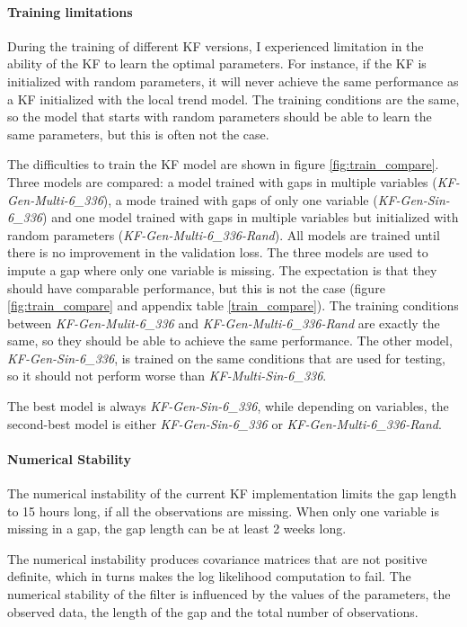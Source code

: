 \documentclass{article}
\begin{document}
\paragraph{Training limitations} During the training of different KF versions, I experienced limitation in the ability of the KF to learn the optimal parameters. For instance, if the KF is initialized with random parameters, it will never achieve the same performance as a KF initialized with the local trend model. The training conditions are the same, so the model that starts with random parameters should be able to learn the same parameters, but this is often not the case.

The difficulties to train the KF model are shown in figure \ref{fig:train_compare}.
Three models are compared: a model trained with gaps in multiple variables (\textit{KF-Gen-Multi-6\_336}), a mode trained with gaps of only one variable (\textit{KF-Gen-Sin-6\_336}) and one model trained with gaps in multiple variables but initialized with random parameters (\textit{KF-Gen-Multi-6\_336-Rand}).
All models are trained until there is no improvement in the validation loss. The three models are used to impute a gap where only one variable is missing.
The expectation is that they should have comparable performance, but this is not the case (figure \ref{fig:train_compare} and appendix table \ref{train_compare}). The training conditions between \textit{KF-Gen-Mulit-6\_336} and \textit{KF-Gen-Multi-6\_336-Rand} are exactly the same, so they should be able to achieve the same performance. The other model, \textit{KF-Gen-Sin-6\_336}, is trained on the same conditions that are used for testing, so it should not perform worse than \textit{KF-Multi-Sin-6\_336}.

The best model is always \textit{KF-Gen-Sin-6\_336}, while depending on variables, the second-best model is either \textit{KF-Gen-Sin-6\_336} or \textit{KF-Gen-Multi-6\_336-Rand}.

\paragraph{Numerical Stability} The numerical instability of the current KF implementation limits the gap length to 15 hours long, if all the observations are missing. When only one variable is missing in a gap, the gap length can be at least 2 weeks long.

The numerical instability produces covariance matrices that are not positive definite, which in turns makes the log likelihood computation to fail. The numerical stability of the filter is influenced by the values of the parameters, the observed data, the length of the gap and the total number of observations.
\end{document}
